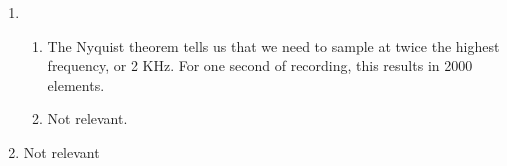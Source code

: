 \begin{enumerate}[label=(\alph*)]
\begin{enumerate}[label=(\alph*)]
    \end{enumerate}

  \item
    \begin{enumerate}[label=(\roman*)]
      \item
        The Nyquist theorem tells us that we need to sample at twice the highest frequency, or 2 KHz. For one second of recording, this results in 2000 elements.

      \item
        Not relevant.

    \end{enumerate}
  \item
    Not relevant
    
\end{enumerate}
    


